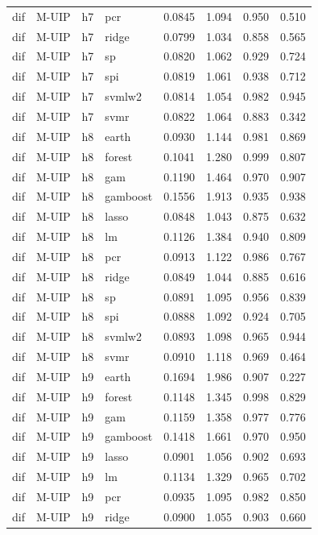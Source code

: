 \begin{ThreePartTable}
\begin{longtable}[t]{llclcccc}
dif & M-UIP & h7 & pcr & 0.0845 & 1.094 & 0.950 & 0.510\\
dif & M-UIP & h7 & ridge & 0.0799 & 1.034 & 0.858 & 0.565\\
dif & M-UIP & h7 & sp & 0.0820 & 1.062 & 0.929 & 0.724\\
dif & M-UIP & h7 & spi & 0.0819 & 1.061 & 0.938 & 0.712\\
dif & M-UIP & h7 & svmlw2 & 0.0814 & 1.054 & 0.982 & 0.945\\
dif & M-UIP & h7 & svmr & 0.0822 & 1.064 & 0.883 & 0.342\\
\addlinespace
dif & M-UIP & h8 & earth & 0.0930 & 1.144 & 0.981 & 0.869\\
dif & M-UIP & h8 & forest & 0.1041 & 1.280 & 0.999 & 0.807\\
dif & M-UIP & h8 & gam & 0.1190 & 1.464 & 0.970 & 0.907\\
dif & M-UIP & h8 & gamboost & 0.1556 & 1.913 & 0.935 & 0.938\\
dif & M-UIP & h8 & lasso & 0.0848 & 1.043 & 0.875 & 0.632\\
dif & M-UIP & h8 & lm & 0.1126 & 1.384 & 0.940 & 0.809\\
dif & M-UIP & h8 & pcr & 0.0913 & 1.122 & 0.986 & 0.767\\
dif & M-UIP & h8 & ridge & 0.0849 & 1.044 & 0.885 & 0.616\\
dif & M-UIP & h8 & sp & 0.0891 & 1.095 & 0.956 & 0.839\\
dif & M-UIP & h8 & spi & 0.0888 & 1.092 & 0.924 & 0.705\\
dif & M-UIP & h8 & svmlw2 & 0.0893 & 1.098 & 0.965 & 0.944\\
dif & M-UIP & h8 & svmr & 0.0910 & 1.118 & 0.969 & 0.464\\
\addlinespace
dif & M-UIP & h9 & earth & 0.1694 & 1.986 & 0.907 & 0.227\\
dif & M-UIP & h9 & forest & 0.1148 & 1.345 & 0.998 & 0.829\\
dif & M-UIP & h9 & gam & 0.1159 & 1.358 & 0.977 & 0.776\\
dif & M-UIP & h9 & gamboost & 0.1418 & 1.661 & 0.970 & 0.950\\
dif & M-UIP & h9 & lasso & 0.0901 & 1.056 & 0.902 & 0.693\\
dif & M-UIP & h9 & lm & 0.1134 & 1.329 & 0.965 & 0.702\\
dif & M-UIP & h9 & pcr & 0.0935 & 1.095 & 0.982 & 0.850\\
dif & M-UIP & h9 & ridge & 0.0900 & 1.055 & 0.903 & 0.660\\

\end{longtable}
\end{ThreePartTable}
